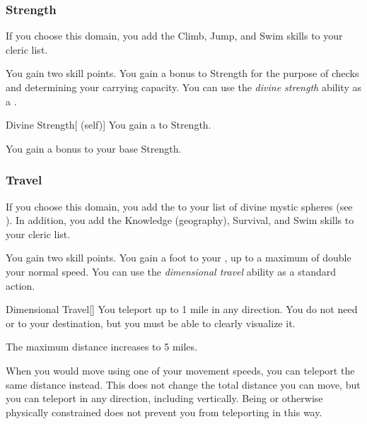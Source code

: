         \subsubsection{Strength}
            If you choose this domain, you add the Climb, Jump, and Swim skills to your cleric  list.

             You gain two skill points.
             You gain a  bonus to Strength for the purpose of checks and determining your carrying capacity.
             You can use the \textit{divine strength} ability as a .
            \begin{attuneability}{Divine Strength}[ (self)]
                You gain a   to Strength.
            \end{attuneability}
             You gain a  bonus to your base Strength.

        \subsubsection{Travel}
            If you choose this domain, you add the   to your list of divine mystic spheres (see ).
            In addition, you add the Knowledge (geography), Survival, and Swim skills to your cleric  list.

             You gain two skill points.
             You gain a  foot  to your , up to a maximum of double your normal speed.
             You can use the \textit{dimensional travel} ability as a standard action.
            \begin{freeability}{Dimensional Travel}[]
                You teleport up to 1 mile in any direction.
                You do not need  or  to your destination, but you must be able to clearly visualize it.

                \rankline
                 The maximum distance increases to 5 miles.
            \end{freeability}
             When you would move using one of your movement speeds, you can teleport the same distance instead.
            This does not change the total distance you can move, but you can teleport in any direction, including vertically.
            Being  or otherwise physically constrained does not prevent you from teleporting in this way.

